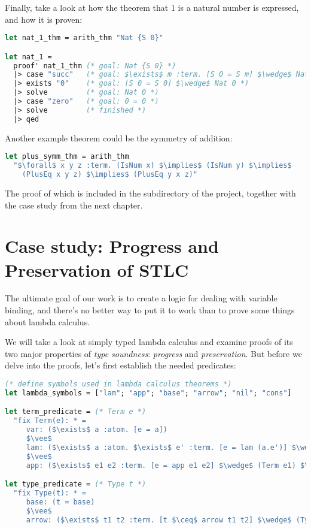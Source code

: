 \documentclass[english, mgr]{iithesis}
\newcommand{\lstt}[1]{\text{{\lstinline[columns=fixed,mathescape]|#1|}}}
\renewcommand{\it}[1]{\textit{#1}}
\begin{document}
\newpage

Finally, take a look at how the theorem that $1$ is a natural number is expressed,
and how it is proven:
\begin{lstlisting}[mathescape, language=OCaml, escapebegin=\color{codegreen}]
let nat_1_thm = arith_thm "Nat {S 0}"

let nat_1 =
  proof' nat_1_thm (* goal: Nat {S 0} *)
  |> case "succ"   (* goal: $\exists$ m :term. [S 0 = S m] $\wedge$ Nat m *)
  |> exists "0"    (* goal: [S 0 = S 0] $\wedge$ Nat 0 *)
  |> solve         (* goal: Nat 0 *)
  |> case "zero"   (* goal: 0 = 0 *)
  |> solve         (* finished *)
  |> qed
\end{lstlisting}
Another example theorem could be the symmetry of addition:
\begin{lstlisting}[mathescape, language=OCaml, escapebegin=\color{codepurple}]
let plus_symm_thm = arith_thm
  "$\forall$ x y z :term. (IsNum x) $\implies$ (IsNum y) $\implies$
    (PlusEq x y z) $\implies$ (PlusEq y x z)"
\end{lstlisting}
The proof of which is included in the \lstt{examples} subdirectory of the project,
together with the case study from the next chapter.
\chapter{Case study: Progress and Preservation of STLC}
The ultimate goal of our work is to create a logic for dealing with variable binding,
and there's no better way to put it to work than to prove some things about lambda calculus.

We will take a look at simply typed lambda calculus and examine proofs of
its two major properties of \it{type soundness}: \it{progress} and \it{preservation}.
But before we delve into the proofs, let's first establish the needed predicates:
\begin{lstlisting}[mathescape,language=OCaml, escapebegin=\color{codepurple}]
(* define symbols used in lambda calculus theorems *)
let lambda_symbols = ["lam"; "app"; "base"; "arrow"; "nil"; "cons"]

let term_predicate = (* Term e *)
  "fix Term(e): * =
     var: ($\exists$ a :atom. [e = a])
     $\vee$
     lam: ($\exists$ a :atom. $\exists$ e' :term. [e = lam (a.e')] $\wedge$ (Term e'))
     $\vee$
     app: ($\exists$ e1 e2 :term. [e = app e1 e2] $\wedge$ (Term e1) $\wedge$ (Term e2))"

let type_predicate = (* Type t *)
  "fix Type(t): * =
     base: (t = base)
     $\vee$
     arrow: ($\exists$ t1 t2 :term. [t $\ceq$ arrow t1 t2] $\wedge$ (Type t1) $\wedge$ (Type t2))"
\end{lstlisting}
\end{document}
